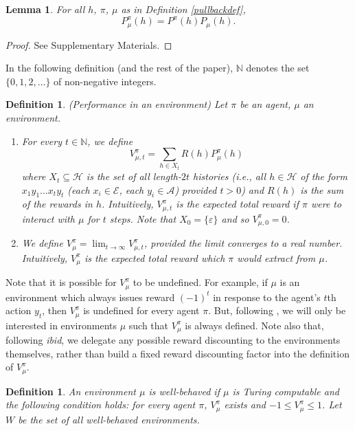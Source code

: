 \documentclass[twoside]{article}
\newtheorem{definition}[theorem]{Definition}
\newtheorem{lemma}[theorem]{Lemma}
\begin{document}
\begin{lemma}
\label{factorizationlemma}
    For all $h$, $\pi$, $\mu$ as in Definition \ref{pullbackdef},
    \[
        P^\pi_\mu(h) = P^\pi(h)P_\mu(h).
    \]
\end{lemma}

\begin{proof}
    See Supplementary Materials.
\end{proof}

In the following definition (and the rest of the paper),
$\mathbb N$ denotes the set $\{0,1,2,\ldots\}$ of non-negative
integers.

\begin{definition}
\label{performancedefn}
    (Performance in an environment)
    Let $\pi$ be an agent, $\mu$ an environment.
    \begin{enumerate}
    \item
        For every $t\in\mathbb N$,
        we define
        \[
            V^\pi_{\mu,t}=\sum_{h\in X_t}R(h)P^\pi_\mu(h)
        \]
        where $X_t\subseteq\mathcal H$ is the set of all
        length-$2t$ histories (i.e., all $h\in\mathcal H$ of the form
        $x_1y_1\ldots x_ty_t$ (each $x_i\in\mathcal E$, each $y_i\in\mathcal A$)
        provided $t>0$) and $R(h)$ is the sum of the rewards in $h$.
        Intuitively, $V^\pi_{\mu,t}$ is the expected total reward
        if $\pi$ were to interact with $\mu$ for $t$ steps.
        Note that $X_0=\{\varepsilon\}$ and so $V^\pi_{\mu,0}=0$.
    \item
        We define $V^\pi_\mu=\lim_{t\to\infty}V^\pi_{\mu,t}$,
        provided the limit converges to a real number.
        Intuitively, $V^\pi_\mu$ is the expected total reward which $\pi$ would extract
        from $\mu$.
    \end{enumerate}
\end{definition}

Note that it is possible for $V^\pi_\mu$ to be undefined.
For example, if $\mu$ is an environment which always issues
reward $(-1)^t$ in response to the agent's $t$th action $y_t$,
then $V^\pi_\mu$ is undefined for every agent $\pi$.
But, following \cite{legg2007universal}, we will only be interested in
environments $\mu$ such that $V^\pi_\mu$
is always defined. Note also that, following \emph{ibid},
we delegate any possible reward discounting to the environments themselves,
rather than build a fixed reward discounting factor into the definition
of $V^\pi_\mu$.

\begin{definition}
\label{wellbehaveddefn}
    An environment $\mu$ is \emph{well-behaved} if $\mu$ is Turing
    computable and the following
    condition holds: for every agent $\pi$, $V^\pi_\mu$ exists and
    $-1\leq V^\pi_\mu\leq 1$. Let $W$ be the set of all well-behaved environments.
\end{definition}
\end{document}
